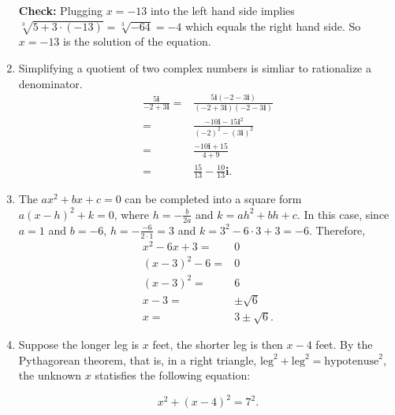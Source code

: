 \documentclass[
  12pt]{article}
\begin{document}
\begin{enumerate}
  \textbf{Check:} Plugging \(x=-13\) into the left hand side implies
  \(\sqrt[3]{5+3\cdot(-13)}=\sqrt[3]{-64}=-4\) which equals the right
  hand side. So \(x=-13\) is the solution of the equation.
\item
  Simplifying a quotient of two complex numbers is simliar to
  rationalize a denominator. \[
  \begin{aligned}
  \frac{5\mathbf{i}}{-2+3\mathbf{i}}=&\frac{5\mathbf{i}(-2-3\mathbf{i})}{(-2+3\mathbf{i})(-2-3\mathbf{i})}\\
  =&\frac{-10\mathbf{i}-15\mathbf{i}^2}{(-2)^2-(3\mathbf{i})^2}\\
  =&\frac{-10\mathbf{i}+15}{4+9}\\
  =&\frac{15}{13}-\frac{10}{13}\mathbf{i}.
  \end{aligned}
  \]
\item
  The \(ax^2+bx+c=0\) can be completed into a square form
  \(a(x-h)^2+k=0\), where \(h=-\frac{b}{2a}\) and \(k=ah^2+bh+c\). In
  this case, since \(a=1\) and \(b=-6\), \(h=-\frac{-6}{2\cdot 1}=3\)
  and \(k=3^2-6\cdot 3+3=-6\). Therefore, \[
  \begin{aligned}
  x^2-6x+3=&0\\
  (x-3)^2-6=&0\\
  (x-3)^2=&6\\
  x-3=&\pm\sqrt{6}\\
  x=&3\pm\sqrt{6}.
  \end{aligned}
  \]
\item
  Suppose the longer leg is \(x\) feet, the shorter leg is then \(x-4\)
  feet. By the Pythagorean theorem, that is, in a right triangle,
  \(\text{leg}^2+\text{leg}^2=\text{hypotenuse}^2\), the unknown \(x\)
  statisfies the following equation:

  \[x^2+(x-4)^2=7^2.\]


\end{enumerate}
\end{document}
